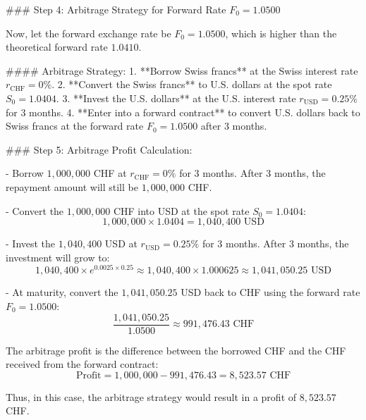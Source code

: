 \documentclass[12pt,letterpaper, onecolumn]{exam}
\begin{document}
\begin{questions}
\begin{solution}
### Step 4: Arbitrage Strategy for Forward Rate \( F_0 = 1.0500 \)

Now, let the forward exchange rate be \( F_0 = 1.0500 \), which is higher than the theoretical forward rate \( 1.0410 \).

#### Arbitrage Strategy:
1. **Borrow Swiss francs** at the Swiss interest rate \( r_{\text{CHF}} = 0\% \).
2. **Convert the Swiss francs** to U.S. dollars at the spot rate \( S_0 = 1.0404 \).
3. **Invest the U.S. dollars** at the U.S. interest rate \( r_{\text{USD}} = 0.25\% \) for 3 months.
4. **Enter into a forward contract** to convert U.S. dollars back to Swiss francs at the forward rate \( F_0 = 1.0500 \) after 3 months.

### Step 5: Arbitrage Profit Calculation:

- Borrow \( 1,000,000 \) CHF at \( r_{\text{CHF}} = 0\% \) for 3 months. After 3 months, the repayment amount will still be \( 1,000,000 \) CHF.
  
- Convert the \( 1,000,000 \) CHF into USD at the spot rate \( S_0 = 1.0404 \):
\[
1,000,000 \times 1.0404 = 1,040,400 \text{ USD}
\]

- Invest the \( 1,040,400 \) USD at \( r_{\text{USD}} = 0.25\% \) for 3 months. After 3 months, the investment will grow to:
\[
1,040,400 \times e^{0.0025 \times 0.25} \approx 1,040,400 \times 1.000625 \approx 1,041,050.25 \text{ USD}
\]

- At maturity, convert the \( 1,041,050.25 \) USD back to CHF using the forward rate \( F_0 = 1.0500 \):
\[
\frac{1,041,050.25}{1.0500} \approx 991,476.43 \text{ CHF}
\]

The arbitrage profit is the difference between the borrowed CHF and the CHF received from the forward contract:
\[
\text{Profit} = 1,000,000 - 991,476.43 = 8,523.57 \text{ CHF}
\]

Thus, in this case, the arbitrage strategy would result in a profit of \( 8,523.57 \) CHF.

\end{solution}


    
\end{questions}
\end{document}
